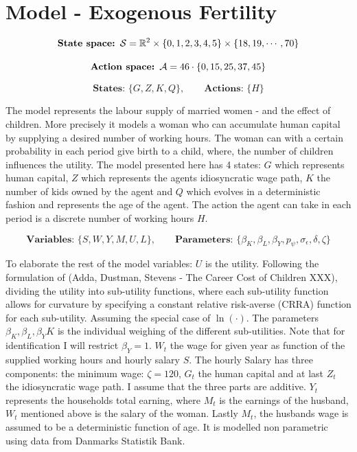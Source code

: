 \section{Model - Exogenous Fertility}

\begin{equation}
    \textbf{State space: }\mathcal{S} = \mathbb{R}^{2} \times \{0, 1, 2, 3, 4, 5\} \times \{ 18, 19, \cdots, 70\}
\end{equation}

\begin{equation}
    \textbf{Action space: }\mathcal{A}  = 46 \cdot \{0, 15, 25, 37, 45\} 
\end{equation}

\begin{equation}
    \textbf{States: }\{G, Z, K, Q\}, \qquad \textbf{Actions: } \{H\} 
\end{equation}

The model represents the labour supply of married women - and the effect of children. More precisely it models a woman who can accumulate human capital by supplying a desired number of working hours. The woman can with a certain probability in each period give birth to a child, where, the number of children influences the utility. The model presented here has 4 states: $G$ which represents human capital, $Z$ which represents the agents idiosyncratic wage path, $K$ the number of kids owned by the agent and $Q$ which evolves in a deterministic fashion and represents the age of the agent. The action the agent can take in each period is a discrete number of working hours $H$.

\begin{equation}
    \textbf{Variables: }\{S, W, Y, M, U, L\},  \qquad \textbf{Parameters: } \{\beta_K, \beta_L, \beta_Y, p_\psi, \sigma_\epsilon, \delta, \zeta\}
\end{equation}


To elaborate the rest of the model variables: $U$ is the utility. Following the formulation of (Adda, Dustman, Stevens - The Career Cost of Children XXX), dividing the utility into sub-utility functions, where each sub-utility function allows for curvature by specifying a constant relative risk-averse (CRRA) function for each sub-utility. Assuming the special case of $\ln(\cdot)$. The parameters $\beta_K, \beta_L, \beta_YK$ is the individual weighing of the different sub-utilities. Note that for identification I will restrict $\beta_Y= 1$. $W_t$ the wage for given year as function of the supplied working hours and hourly salary $S$. The hourly Salary has three components: the minimum wage: $\zeta=120$, $G_t$ the human capital and at last $Z_t$ the idiosyncratic wage path. I assume that the three parts are additive. $Y_t$ represents the households total earning, where $M_t$ is the earnings of the husband, $W_t$ mentioned above is the salary of the woman. Lastly $M_t$, the husbands wage is assumed to be a deterministic function of age. It is modelled non parametric using data from Danmarks Statistik Bank.

